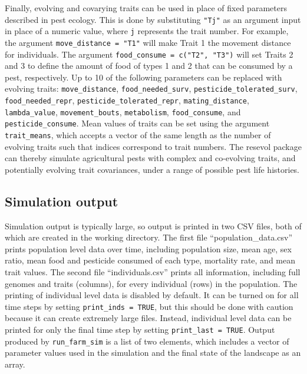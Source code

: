 \documentclass[
]{article}
\begin{document}
Finally, evolving and covarying traits can be used in place of fixed parameters described in pest ecology.
This is done by substituting \texttt{"Tj"} as an argument input in place of a numeric value, where \texttt{j} represents the trait number.
For example, the argument \texttt{move\_distance\ =\ "T1"} will make Trait 1 the movement distance for individuals.
The argument \texttt{food\_consume\ =\ c("T2",\ "T3")} will set Traits 2 and 3 to define the amount of food of types 1 and 2 that can be consumed by a pest, respectively.
Up to 10 of the following parameters can be replaced with evolving traits: \texttt{move\_distance}, \texttt{food\_needed\_surv}, \texttt{pesticide\_tolerated\_surv}, \texttt{food\_needed\_repr}, \texttt{pesticide\_tolerated\_repr}, \texttt{mating\_distance}, \texttt{lambda\_value}, \texttt{movement\_bouts}, \texttt{metabolism}, \texttt{food\_consume}, and \texttt{pesticide\_consume}.
Mean values of traits can be set using the argument \texttt{trait\_means}, which accepts a vector of the same length as the number of evolving traits such that indices correspond to trait numbers.
The resevol package can thereby simulate agricultural pests with complex and co-evolving traits, and potentially evolving trait covariances, under a range of possible pest life histories.

\hypertarget{output}{%
\subsection{Simulation output}\label{output}}

Simulation output is typically large, so output is printed in two CSV files, both of which are created in the working directory.
The first file ``population\_data.csv'' prints population level data over time, including population size, mean age, sex ratio, mean food and pesticide consumed of each type, mortality rate, and mean trait values.
The second file ``individuals.csv'' prints all information, including full genomes and traits (columns), for every individual (rows) in the population.
The printing of individual level data is disabled by default.
It can be turned on for all time steps by setting \texttt{print\_inds\ =\ TRUE}, but this should be done with caution because it can create extremely large files.
Instead, individual level data can be printed for only the final time step by setting \texttt{print\_last\ =\ TRUE}.
Output produced by \texttt{run\_farm\_sim} is a list of two elements, which includes a vector of parameter values used in the simulation and the final state of the landscape as an array.
\end{document}
